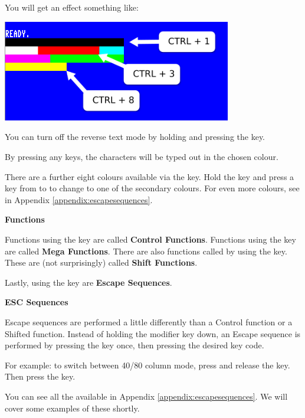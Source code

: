 \newpage

You will get an effect something like:


\begin{center}
\includegraphics[width={10cm}]{images/introduction-screen/colour-bars.png}
\end{center}


You can turn off the reverse text mode by holding  and pressing the  key.

By pressing any keys, the characters will be typed out in the chosen colour.

There are a further eight colours available via the \megasymbolkey key. Hold the \megasymbolkey key and press a key from  to  to change to one of the secondary colours. For even more colours, see  in Appendix \ref{appendix:escapesequences}.


\textbf{Functions}

Functions using the  key are called \textbf{Control Functions}.
Functions using the \megasymbolkey key are called \textbf{Mega Functions}. There are also functions called by using the  key. These are (not surprisingly) called \textbf{Shift Functions}.

Lastly, using the  key are \textbf{Escape Sequences}.

\textbf{ESC Sequences}

Escape sequences are performed a little differently than a Control function or a Shifted function. Instead of holding the modifier key down, an Escape sequence is performed by pressing the  key once, then pressing the desired key code.

For example: to switch between 40/80 column mode, press and release the  key. Then press the  key.

You can see all the available  in Appendix \ref{appendix:escapesequences}. We will cover some examples of these shortly.

